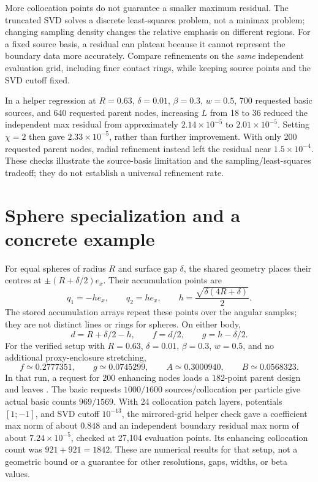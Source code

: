 \documentclass[11pt,a4paper]{article}
\newcommand{\code}[1]{\texttt{\detokenize{#1}}}
\begin{document}
More collocation points do not guarantee a smaller maximum residual.  The
truncated SVD solves a discrete least-squares problem, not a minimax problem;
changing sampling density changes the relative emphasis on different regions.
For a fixed source basis, a residual can plateau because it cannot represent
the boundary data more accurately.  Compare refinements on the \emph{same}
independent evaluation grid, including finer contact rings, while keeping
source points and the SVD cutoff fixed.

In a helper regression at $R=0.63$, $\delta=0.01$, $\beta=0.3$, $w=0.5$,
700 requested basic sources, and 640 requested parent nodes, increasing
$L$ from 18 to 36 reduced the independent max residual from approximately
$2.14\times10^{-5}$ to $2.01\times10^{-5}$.  Setting $\chi=2$ then gave
$2.33\times10^{-5}$, rather than further improvement.  With only 200 requested
parent nodes, radial refinement instead left the residual near
$1.5\times10^{-4}$.  These checks illustrate the source-basis limitation and
the sampling/least-squares tradeoff; they do not establish a universal
refinement rate.

\section{Sphere specialization and a concrete example}

For equal spheres of radius $R$ and surface gap $\delta$, the shared geometry
places their centres at $\pm(R+\delta/2)e_x$.  Their accumulation points are
\[
 q_1=-h e_x,\qquad q_2=h e_x,\qquad
 h=\frac{\sqrt{\delta(4R+\delta)}}{2}.
\]
The stored accumulation arrays repeat these points over the angular samples;
they are not distinct lines or rings for spheres.  On either body,
\[
 d=R+\delta/2-h,\qquad f=d/2,\qquad g=h-\delta/2.
\]
For the verified setup with $R=0.63$, $\delta=0.01$, $\beta=0.3$, $w=0.5$,
and no additional proxy-enclosure stretching,
\[
 f\simeq0.2777351,\qquad g\simeq0.0745299,\qquad
 A\simeq0.3000940,\qquad B\simeq0.0568323.
\]
In that run, a request for $200$ enhancing nodes loads a $182$-point parent
design and leaves \code{cap1/cap2 = 20/20}.  The basic requests
$1000/1600$ sources/collocation per particle give actual basic counts
$969/1569$.  With 24 collocation patch layers, potentials $[1;-1]$, and SVD
cutoff $10^{-13}$, the mirrored-grid helper check gave a coefficient max norm
of about $0.848$ and an independent boundary residual max norm of about
$7.24\times10^{-5}$, checked at 27,104 evaluation points.
Its enhancing collocation count was $921+921=1842$.
These are numerical results for that setup, not a geometric bound or a
guarantee for other resolutions, gaps, widths, or beta values.
\end{document}
